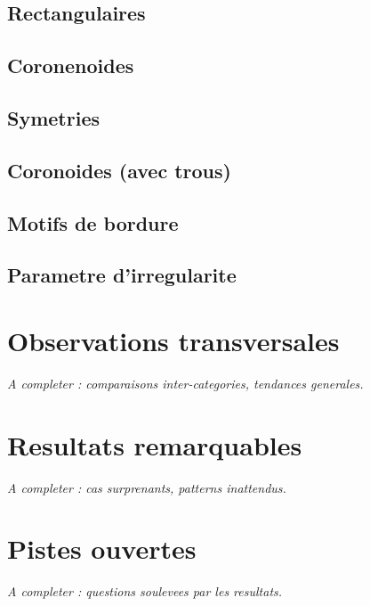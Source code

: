 \documentclass[a4paper,11pt]{article}
\begin{document}
\subsection{Rectangulaires}

\subsection{Coronenoides}

\subsection{Symetries}

\subsection{Coronoides (avec trous)}

\subsection{Motifs de bordure}

\subsection{Parametre d'irregularite}

\section{Observations transversales}

\textit{A completer : comparaisons inter-categories, tendances generales.}

\section{Resultats remarquables}

\textit{A completer : cas surprenants, patterns inattendus.}

\section{Pistes ouvertes}

\textit{A completer : questions soulevees par les resultats.}
\end{document}
